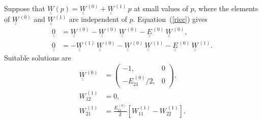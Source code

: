 \documentclass[12pt,prb,aps]{revtex4-1}
\begin{document}
Suppose that  $\underline{\underline{W}}(p)= \underline{\underline{W}}^{\,(0)}+ \underline{\underline{W}}^{\,(1)}\,p$ at small values of $p$,
where the elements of  $\underline{\underline{W}}^{\,(0)}$ and $\underline{\underline{W}}^{\,(1)}$ are independent of $p$. 
Equation~(\ref{ricc}) gives
\begin{align}
\underline{\underline{0}}&= \underline{\underline{W}}^{\,(0)}-\underline{\underline{W}}^{\,(0)}\,\underline{\underline{W}}^{\,(0)}- 
\underline{\underline{E}}^{\,(0)}\,\underline{\underline{W}}^{\,(0)},\\[0.5ex]
\underline{\underline{0}}&= -\underline{\underline{W}}^{\,(1)}\,\underline{\underline{W}}^{\,(0)}-\underline{\underline{W}}^{\,(0)}\,\underline{\underline{W}}^{\,(1)}- 
\underline{\underline{E}}^{\,(0)}\,\underline{\underline{W}}^{\,(1)}.
\end{align}
Suitable solutions are
\begin{align}\label{w0def}
\underline{\underline{W}}^{\,(0)} &=  \left(\begin{array}{cc} -1,&0\\-E_{21}^{\,(0)}/2,&0\end{array}\right),\\[0.5ex]
W_{12}^{\,(1)} &= 0,\\[0.5ex]
W_{21}^{\,(1)}& = \frac{E_{21}^{\,(0)}}{2}\left[W_{11}^{\,(1)}- W_{22}^{\,(1)}\right].\label{w21def}
\end{align}
\end{document}
